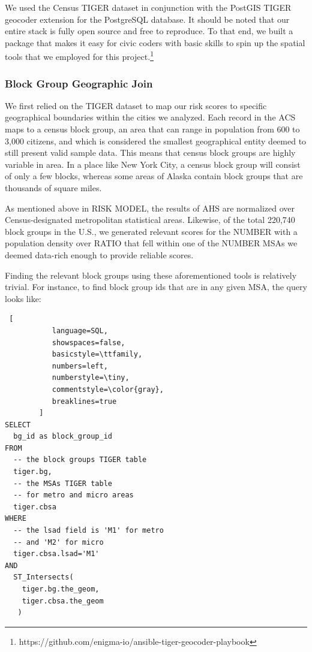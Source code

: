 \documentclass{sig-alternate}
\begin{document}
We used the Census TIGER dataset in conjunction with the PostGIS TIGER geocoder extension for the PostgreSQL database. It should be noted that our entire stack is fully open source and free to reproduce. To that end, we built a package that makes it easy for civic coders with basic skills to spin up the spatial tools that we employed for this project.\footnote{https://github.com/enigma-io/ansible-tiger-geocoder-playbook} 

\subsubsection{Block Group Geographic Join}

We first relied on the TIGER dataset to map our risk scores to specific geographical boundaries within the cities we analyzed. Each record in the ACS maps to a census block group, an area that can range in population from 600 to 3,000 citizens, and which is considered the smallest geographical entity deemed to still present valid sample data. This means that census block groups are highly variable in area. In a place like New York City, a census block group will consist of only a few blocks, whereas some areas of Alaska contain block groups that are thousands of square miles.

As mentioned above in RISK MODEL, the results of AHS are normalized over Census-designated metropolitan statistical areas. Likewise, of the total 220,740 block groups in the U.S., we generated relevant scores for the NUMBER with a population density over RATIO that fell within one of the NUMBER MSAs we deemed data-rich enough to provide reliable scores.

Finding the relevant block groups using these aforementioned tools is relatively trivial. For instance, to find block group ids that are in any given MSA, the query looks like:

\begin{lstlisting} [
           language=SQL,
           showspaces=false,
           basicstyle=\ttfamily,
           numbers=left,
           numberstyle=\tiny,
           commentstyle=\color{gray},
           breaklines=true
        ]
SELECT 
  bg_id as block_group_id
FROM 
  -- the block groups TIGER table
  tiger.bg, 
  -- the MSAs TIGER table
  -- for metro and micro areas
  tiger.cbsa
WHERE 
  -- the lsad field is 'M1' for metro 
  -- and 'M2' for micro
  tiger.cbsa.lsad='M1'
AND
  ST_Intersects(
    tiger.bg.the_geom,
    tiger.cbsa.the_geom
   )
\end{lstlisting}
\end{document}
